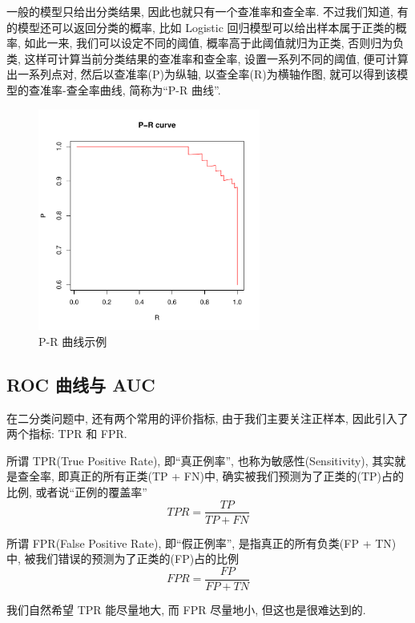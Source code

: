 \documentclass[a4paper,UTF8]{ctexart}
\theoremstyle{plain} \newtheorem{theorem}{定理}[section]
\theoremstyle{plain} \newtheorem{definition}{定义}[section]
\theoremstyle{plain} \newtheorem{lemma}{引理}[section]
\theoremstyle{plain} \newtheorem{proposition}{命题}[section]
\theoremstyle{plain} \newtheorem{example}{例}[section]
\theoremstyle{plain} \newtheorem{remark}{注}[section]
\theoremstyle{plain} \newtheorem{corollary}{推论}[section]
\begin{document}
一般的模型只给出分类结果, 因此也就只有一个查准率和查全率. 不过我们知道, 有的模型还可以返回分类的概率, 比如 Logistic 回归模型可以给出样本属于正类的概率, 如此一来, 我们可以设定不同的阈值, 概率高于此阈值就归为正类, 否则归为负类, 这样可计算当前分类结果的查准率和查全率, 设置一系列不同的阈值, 便可计算出一系列点对, 然后以查准率(P)为纵轴, 以查全率(R)为横轴作图, 就可以得到该模型的查准率-查全率曲线, 简称为“P-R 曲线”.
\begin{figure}[!htb]
	\centering
	\includegraphics[width=0.65\textwidth]{P-R.pdf}
	\caption{P-R 曲线示例}
	\label{pr}
\end{figure}


\subsection{ROC 曲线与 AUC}
在二分类问题中, 还有两个常用的评价指标, 由于我们主要关注正样本, 因此引入了两个指标: TPR 和 FPR.

所谓 TPR(True Positive Rate), 即“真正例率”, 也称为敏感性(Sensitivity), 其实就是查全率, 即真正的所有正类(TP + FN)中, 确实被我们预测为了正类的(TP)占的比例, 或者说“正例的覆盖率”
\begin{equation}
TPR = \frac{TP}{TP + FN}
\end{equation}

所谓 FPR(False Positive Rate), 即“假正例率”, 是指真正的所有负类(FP + TN)中, 被我们错误的预测为了正类的(FP)占的比例
\begin{equation}
FPR = \frac{FP}{FP + TN}
\end{equation}

我们自然希望 TPR 能尽量地大, 而 FPR 尽量地小, 但这也是很难达到的.
\end{document}
